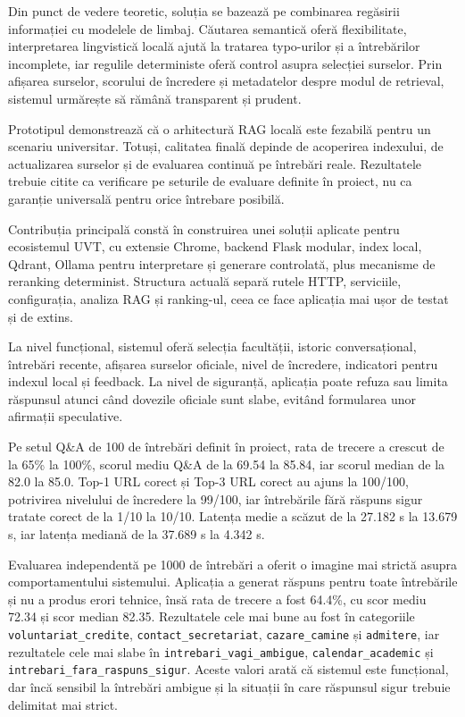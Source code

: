 \documentclass[12pt,a4paper]{report}
\theoremstyle{definition}
\theoremstyle{remark}
\begin{document}
Din punct de vedere teoretic, soluția se bazează pe combinarea regăsirii informației cu modelele de limbaj. Căutarea semantică oferă flexibilitate, interpretarea lingvistică locală ajută la tratarea typo-urilor și a întrebărilor incomplete, iar regulile deterministe oferă control asupra selecției surselor. Prin afișarea surselor, scorului de încredere și metadatelor despre modul de retrieval, sistemul urmărește să rămână transparent și prudent.

Prototipul demonstrează că o arhitectură RAG locală este fezabilă pentru un scenariu universitar. Totuși, calitatea finală depinde de acoperirea indexului, de actualizarea surselor și de evaluarea continuă pe întrebări reale. Rezultatele trebuie citite ca verificare pe seturile de evaluare definite în proiect, nu ca garanție universală pentru orice întrebare posibilă.

Contribuția principală constă în construirea unei soluții aplicate pentru ecosistemul UVT, cu extensie Chrome, backend Flask modular, index local, Qdrant, Ollama pentru interpretare și generare controlată, plus mecanisme de reranking determinist. Structura actuală separă rutele HTTP, serviciile, configurația, analiza RAG și ranking-ul, ceea ce face aplicația mai ușor de testat și de extins.

La nivel funcțional, sistemul oferă selecția facultății, istoric conversațional, întrebări recente, afișarea surselor oficiale, nivel de încredere, indicatori pentru indexul local și feedback. La nivel de siguranță, aplicația poate refuza sau limita răspunsul atunci când dovezile oficiale sunt slabe, evitând formularea unor afirmații speculative.

Pe setul Q\&A de 100 de întrebări definit în proiect, rata de trecere a crescut de la 65\% la 100\%, scorul mediu Q\&A de la 69.54 la 85.84, iar scorul median de la 82.0 la 85.0. Top-1 URL corect și Top-3 URL corect au ajuns la 100/100, potrivirea nivelului de încredere la 99/100, iar întrebările fără răspuns sigur tratate corect de la 1/10 la 10/10. Latența medie a scăzut de la 27.182 s la 13.679 s, iar latența mediană de la 37.689 s la 4.342 s.

Evaluarea independentă pe 1000 de întrebări a oferit o imagine mai strictă asupra comportamentului sistemului. Aplicația a generat răspuns pentru toate întrebările și nu a produs erori tehnice, însă rata de trecere a fost 64.4\%, cu scor mediu 72.34 și scor median 82.35. Rezultatele cele mai bune au fost în categoriile \texttt{voluntariat\_credite}, \texttt{contact\_secretariat}, \texttt{cazare\_camine} și \texttt{admitere}, iar rezultatele cele mai slabe în \texttt{intrebari\_vagi\_ambigue}, \texttt{calendar\_academic} și \texttt{intrebari\_fara\_raspuns\_sigur}. Aceste valori arată că sistemul este funcțional, dar încă sensibil la întrebări ambigue și la situații în care răspunsul sigur trebuie delimitat mai strict.
\end{document}
